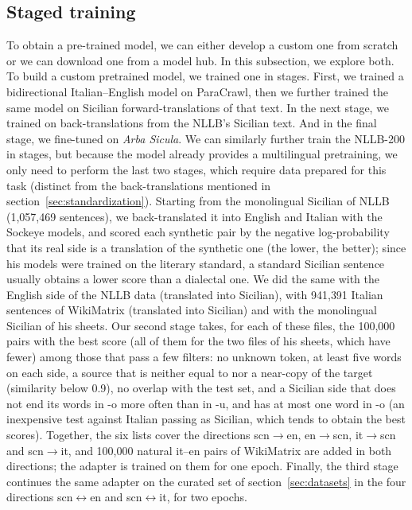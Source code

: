 \documentclass[11pt,a4paper]{article}
\begin{document}
\subsection{Staged training}
\label{sec:staged}
To obtain a pre-trained model, we can either develop a custom one from scratch
or we can download one from a model hub.  In this subsection, we explore both.
To build a custom pretrained model, we trained one in stages.
First, we trained a bidirectional Italian--English model on ParaCrawl,
then we further trained the same model on Sicilian forward-translations of that text.
In the next stage, we trained on back-translations from the NLLB's Sicilian text.
And in the final stage, we fine-tuned on \emph{Arba Sicula}.
We can similarly further train the NLLB-200 in stages,
but because the model already provides a multilingual pretraining,
we only need to perform the last two stages,
which require data prepared for this task
(distinct from the back-translations
mentioned in section~\ref{sec:standardization}).
Starting from the monolingual Sicilian of NLLB (1{,}057{,}469 sentences), we
back-translated it into English and Italian with the Sockeye models,
and scored each synthetic pair by the negative log-probability that
its real side is a translation of the synthetic one (the lower, the better);
since his models were trained on the literary standard,
a standard Sicilian sentence usually obtains a lower score than a dialectal one.
We did the same with the English side of the NLLB data (translated into Sicilian),
with 941{,}391 Italian sentences of WikiMatrix (translated into Sicilian)
and with the monolingual Sicilian of his sheets.
Our second stage takes, for each of these
files, the 100{,}000 pairs with the
best score
(all of them for the two files of his sheets, which have fewer)
among those that pass a few filters:
no unknown token,
at least five words on each side,
a source that is neither equal to nor a near-copy of the target (similarity below 0.9),
no overlap with the test set, and
a Sicilian side that does not end its words in -o more often than in -u, and has at most one word in -o
(an inexpensive test against Italian passing as Sicilian,
which tends to obtain the
best scores).
Together, the six lists cover the directions
scn$\to$en, en$\to$scn, it$\to$scn and scn$\to$it, and 100{,}000 natural it--en pairs of
WikiMatrix are added in both directions; the adapter is trained on them for one epoch.
Finally, the third stage continues the same adapter on the curated set of section~\ref{sec:datasets}
in the four directions scn$\leftrightarrow$en and scn$\leftrightarrow$it, for two epochs.
\end{document}
